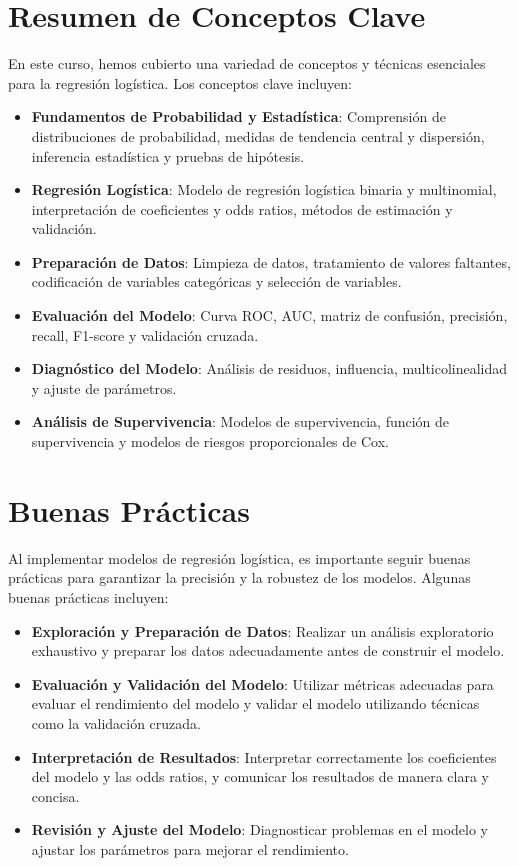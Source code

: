 \section{Resumen de Conceptos Clave}

En este curso, hemos cubierto una variedad de conceptos y t\'ecnicas esenciales para la regresi\'on log\'istica. Los conceptos clave incluyen:

\begin{itemize}
    \item \textbf{Fundamentos de Probabilidad y Estad\'istica}: Comprensi\'on de distribuciones de probabilidad, medidas de tendencia central y dispersi\'on, inferencia estad\'istica y pruebas de hip\'otesis.
    \item \textbf{Regresi\'on Log\'istica}: Modelo de regresi\'on log\'istica binaria y multinomial, interpretaci\'on de coeficientes y odds ratios, m\'etodos de estimaci\'on y validaci\'on.
    \item \textbf{Preparaci\'on de Datos}: Limpieza de datos, tratamiento de valores faltantes, codificaci\'on de variables categ\'oricas y selecci\'on de variables.
    \item \textbf{Evaluaci\'on del Modelo}: Curva ROC, AUC, matriz de confusi\'on, precisi\'on, recall, F1-score y validaci\'on cruzada.
    \item \textbf{Diagn\'ostico del Modelo}: An\'alisis de residuos, influencia, multicolinealidad y ajuste de par\'ametros.
    \item \textbf{An\'alisis de Supervivencia}: Modelos de supervivencia, funci\'on de supervivencia y modelos de riesgos proporcionales de Cox.
\end{itemize}

\section{Buenas Pr\'acticas}

Al implementar modelos de regresi\'on log\'istica, es importante seguir buenas pr\'acticas para garantizar la precisi\'on y la robustez de los modelos. Algunas buenas pr\'acticas incluyen:

\begin{itemize}
    \item \textbf{Exploraci\'on y Preparaci\'on de Datos}: Realizar un an\'alisis exploratorio exhaustivo y preparar los datos adecuadamente antes de construir el modelo.
    \item \textbf{Evaluaci\'on y Validaci\'on del Modelo}: Utilizar m\'etricas adecuadas para evaluar el rendimiento del modelo y validar el modelo utilizando t\'ecnicas como la validaci\'on cruzada.
    \item \textbf{Interpretaci\'on de Resultados}: Interpretar correctamente los coeficientes del modelo y las odds ratios, y comunicar los resultados de manera clara y concisa.
    \item \textbf{Revisi\'on y Ajuste del Modelo}: Diagnosticar problemas en el modelo y ajustar los par\'ametros para mejorar el rendimiento.
\end{itemize}

